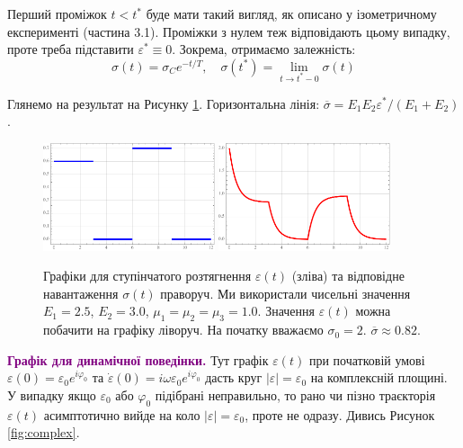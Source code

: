 \documentclass{hw_template}
\begin{document}
Перший проміжок $t < t^*$ буде мати такий вигляд, як описано у ізометричному
експерименті (частина 3.1). Проміжки з нулем теж відповідають цьому випадку,
проте треба підставити $\varepsilon^* \equiv 0$. Зокрема, отримаємо залежність:
\begin{equation*}
    \sigma(t) = \sigma_Ce^{-t/T}, \quad \sigma(t^*) = \lim_{t \to t^*-0}\sigma(t)
\end{equation*}

Глянемо на результат на Рисунку \ref{fig:piecewise2}. Горизонтальна лінія: $\overline{\sigma} = E_1E_2 \varepsilon^*/(E_1+E_2)$.

\begin{figure}[H]
    \centering
    \includegraphics[width=0.45\textwidth]{images/exam/e_piecewise.pdf}
    \includegraphics[width=0.45\textwidth]{images/exam/stress_piecewise.pdf}
    \caption{Графіки для ступінчатого розтягнення $\varepsilon(t)$ (зліва) та відповідне 
    навантаження $\sigma(t)$ праворуч. Ми використали чисельні значення 
    $E_1=2.5$, $E_2=3.0$, $\mu_1=\mu_2=\mu_3=1.0$. Значення $\varepsilon(t)$ можна 
    побачити на графіку ліворуч. На початку вважаємо $\sigma_0=2$. $\overline{\sigma} \approx 0.82.$}
    \label{fig:piecewise2}
\end{figure}

\textcolor{purple}{\textbf{Графік для динамічної поведінки.}} Тут графік
$\varepsilon(t)$ при початковій умові $\varepsilon(0) = \varepsilon_0
e^{i\varphi_0}$ та $\dot{\varepsilon}(0) = i\omega \varepsilon_0 e^{i\varphi_0}$ дасть
круг $|\varepsilon| = \varepsilon_0$ на комплексній площині. У випадку якщо
$\varepsilon_0$ або $\varphi_0$ підібрані неправильно, то рано чи пізно
траєкторія $\varepsilon(t)$ асимптотично вийде на коло $|\varepsilon| =
\varepsilon_0$, проте не одразу. Дивись Рисунок \ref{fig:complex}.
\end{document}
